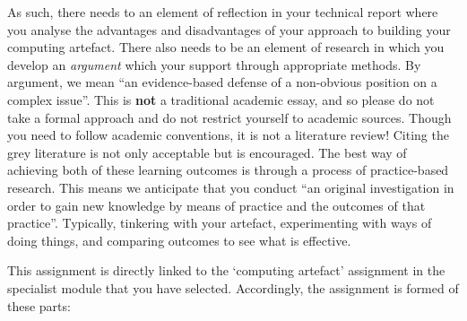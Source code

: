 \documentclass{../../fal_assignment}
\begin{document}
As such, there needs to an element of reflection in your technical report where you analyse the advantages and disadvantages of your approach to building
your computing artefact. There also needs to be an element of research in which you develop an \textit{argument} which your support through appropriate methods. By argument,
we mean ``an evidence-based defense of a non-obvious position on a complex issue''. This is \textbf{not} a traditional academic essay, and so please do not take a formal approach and do not restrict yourself to academic sources. Though you need to follow academic conventions, it is not a literature review! Citing the grey literature is not only acceptable but is encouraged. The best way of achieving both of these learning outcomes is through a process of practice-based research. This means we anticipate that you conduct ``an original investigation in order to gain new knowledge by means of practice and the outcomes of that practice''. Typically, tinkering with your artefact, experimenting with ways of doing things, and comparing outcomes to see what is effective.

This assignment is directly linked to the `computing artefact' assignment in the specialist module that you have selected. Accordingly, the assignment is formed of these parts:
\end{document}
